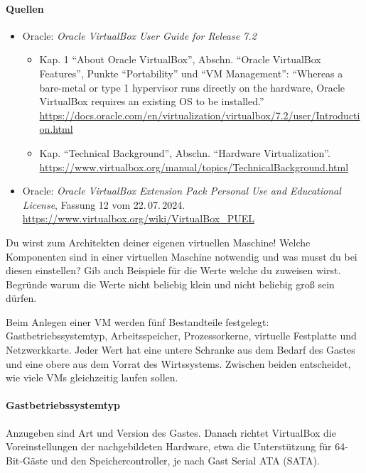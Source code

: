 \paragraph{Quellen}
\begin{itemize}[quellen]
  \item Oracle: \emph{Oracle VirtualBox User Guide for Release 7.2}
  \begin{itemize}[nosep]
    \item Kap. 1 \enquote{About Oracle VirtualBox}, Abschn. \enquote{Oracle VirtualBox Features}, Punkte \enquote{Portability} und \enquote{VM Management}: \enquote{Whereas a bare-metal or type 1 hypervisor runs directly on the hardware, Oracle VirtualBox requires an existing OS to be installed.} \url{https://docs.oracle.com/en/virtualization/virtualbox/7.2/user/Introduction.html}
    \item Kap. \enquote{Technical Background}, Abschn. \enquote{Hardware Virtualization}. \url{https://www.virtualbox.org/manual/topics/TechnicalBackground.html}
  \end{itemize}
  \item Oracle: \emph{Oracle VirtualBox Extension Pack Personal Use and Educational License}, Fassung 12 vom 22.\,07.\,2024. \url{https://www.virtualbox.org/wiki/VirtualBox_PUEL}
\end{itemize}

\begin{aufgabe}
Du wirst zum Architekten deiner eigenen virtuellen Maschine! Welche Komponenten sind in einer virtuellen Maschine notwendig und was musst du bei diesen einstellen? Gib auch Beispiele für die Werte welche du zuweisen wirst. Begründe warum die Werte nicht beliebig klein und nicht beliebig groß sein dürfen.
\end{aufgabe}
\label{sec:eigene-vm}

Beim Anlegen einer VM werden fünf Bestandteile festgelegt: Gastbetriebssystemtyp, Arbeitsspeicher, Prozessorkerne, virtuelle Festplatte und Netzwerkkarte. Jeder Wert hat eine untere Schranke aus dem Bedarf des Gastes und eine obere aus dem Vorrat des Wirtssystems. Zwischen beiden entscheidet, wie viele VMs gleichzeitig laufen sollen.

\paragraph{Gastbetriebssystemtyp} Anzugeben sind Art und Version des Gastes. Danach richtet VirtualBox die Voreinstellungen der nachgebildeten Hardware, etwa die Unterstützung für 64-Bit-Gäste und den Speichercontroller, je nach Gast Serial ATA (SATA).


